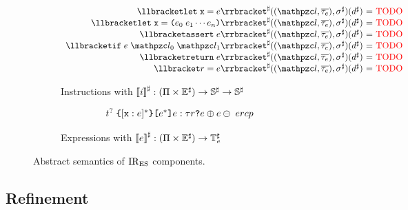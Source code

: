 \begin{figure}[t]
  \centering
  \begin{subfigure}[b]{0.48\textwidth}
    \[
      \begin{array}{r@{~}c@{~}l}
        \asem{\kwlet \; \x = \expr}
        ((\lab, \overline{\ety}), \aenv)(\aelem)
        &=& \todo \\

        \asem{\kwlet \; \x = \kwrl \expr_0 \; \expr_1 \cdots \expr_n \kwrr}
        ((\lab, \overline{\ety}), \aenv)(\aelem)
        &=& \todo \\

        \asem{\kwassert \; \expr}
        ((\lab, \overline{\ety}), \aenv)(\aelem)
        &=& \todo \\

        \asem{\kwif \; \expr \; \lab_0 \; \lab_1}
        ((\lab, \overline{\ety}), \aenv)(\aelem)
        &=& \todo \\

        \asem{\kwreturn \; \expr}
        ((\lab, \overline{\ety}), \aenv)(\aelem)
        &=& \todo \\

        \asem{\refer = \expr}
        ((\lab, \overline{\ety}), \aenv)(\aelem)
        &=& \todo \\
      \end{array}
    \]
    \caption{Instructions with ${\llbracket{i}\rrbracket}^\sharp: (\Pi \times
    {\mathbb{E}}^\sharp) \rightarrow {\mathbb{S}}^\sharp \rightarrow {\mathbb{S}}^\sharp$}
  \end{subfigure}
  \begin{subfigure}[b]{0.48\textwidth}
    \[
      \begin{array}{r@{~}c@{~}l}
        \tname^? \; \kwcl [\x: \expr]^* \kwcr
        \clist{\expr^*}
        \expr: \ty
        \refer \kwexists
        \expr \bop \expr
        \uop \; \expr
        \refer
        \const
        \prim
      \end{array}
    \]
    \caption{Expressions with ${\llbracket{e}\rrbracket}^\sharp: (\Pi \times {\mathbb{E}}^\sharp)
    \rightarrow \mathbb{T}_e^\sharp$}
  \end{subfigure}
  \caption{Abstract semantics of ${\text{IR}_\text{ES}}$ components.}
  \label{fig:example}
\end{figure}



\subsection{Refinement}\label{sec:refine}
